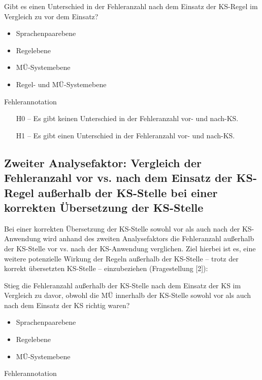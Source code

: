 \begin{description}[font=\normalfont\bfseries]
\item [Fragestellung] Gibt es einen Unterschied in der Fehleranzahl nach dem Einsatz der KS-Regel im Vergleich zu vor dem Einsatz?
\item [Analyseebene]\hfill
  \begin{itemize}
  \item Sprachenpaarebene
  \item Regelebene
  \item MÜ-Systemebene
  \item Regel- und MÜ-Systemebene
  \end{itemize}
\item [Analysemethode] Fehlerannotation
\item [Hypothesen]\hfill
  \begin{itemize}
  \item [H0] -- Es gibt keinen Unterschied in der Fehleranzahl vor- und nach-KS.
  \item [H1] -- Es gibt einen Unterschied in der Fehleranzahl vor- und nach-KS.
  \end{itemize}
\end{description}


\subsection*{Zweiter Analysefaktor: Vergleich der Fehleranzahl vor vs. nach dem Einsatz der KS-Regel außerhalb der KS-Stelle bei einer korrekten Übersetzung der KS-Stelle}

Bei einer korrekten Übersetzung der KS-Stelle sowohl vor als auch nach der KS-Anwendung wird anhand des zweiten Analysefaktors die Fehleranzahl außerhalb der KS-Stelle vor vs. nach der KS-Anwendung verglichen. Ziel hierbei ist es, eine weitere potenzielle Wirkung der Regeln außerhalb der KS-Stelle -- trotz der korrekt übersetzten KS-Stelle -- einzubeziehen (Fragestellung [2]):

\begin{description}[font=\normalfont\bfseries]
\item [Fragestellung] Stieg die Fehleranzahl außerhalb der KS-Stelle nach dem Einsatz der KS im Vergleich zu davor, obwohl die MÜ innerhalb der KS-Stelle sowohl vor als auch nach dem Einsatz der KS richtig waren?
\item [Analyseebene]\hfill
  \begin{itemize}
  \item Sprachenpaarebene
  \item Regelebene
  \item MÜ-Systemebene
  \end{itemize}
\item [Analysemethode] Fehlerannotation
\end{description}



